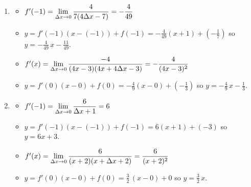 \documentclass{ximera}
\begin{document}
\begin{enumerate}
\setcounter{enumi}{\value{HW}}

\item \begin{itemize}

\item  $f'(-1) =\ds{ \lim_{\Delta x \rightarrow 0} \dfrac{4}{7(4 \Delta x - 7)} = - \dfrac{4}{49}}$

\smallskip

\item $y = f'(-1)(x-(-1)) + f(-1) = -\frac{4}{49}(x + 1) + \left(-\frac{1}{7}\right)$ so $y = -\frac{4}{49} \, x - \frac{11}{49}$.   

\smallskip

\item  $f'(x) = \ds{ \lim_{\Delta x \rightarrow 0} \dfrac{-4}{(4x-3)(4x+4\Delta x-3)} =  - \dfrac{4}{(4x-3)^2}}$  

\smallskip

\item $y = f'(0)(x-0)+f(0) = -\frac{4}{9} (x-0) + \left(-\frac{1}{3}\right)$ so $y = -\frac{4}{9} \, x - \frac{1}{3}$.

\smallskip

\end{itemize}
   
\item \begin{itemize}

\item  $f'(-1) = \ds{ \lim_{\Delta x \rightarrow 0} \dfrac{6}{\Delta x + 1}= 6}$

\smallskip

\item $y = f'(-1)(x-(-1)) + f(-1) = 6(x+1) + (-3)$ so $y = 6x+3$.

\smallskip

\item  $f'(x) =\ds{ \lim_{\Delta x \rightarrow 0} \dfrac{6}{(x+2)(x+\Delta x+2)} =   \dfrac{6}{(x+2)^2}}$ 

\smallskip    

\item  $y = f'(0)(x-0) + f(0) = \frac{3}{2} \, (x-0)+0$ so $y = \frac{3}{2} \, x$.


\smallskip


\end{itemize}

 
\setcounter{HW}{\value{enumi}}
\end{enumerate}
\end{document}

